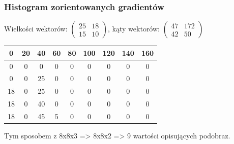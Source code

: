 \documentclass{beamer}
\begin{document}
            \begin{frame}
                \frametitle{Histogram zorientowanych gradientów}
                        Wielkości wektorów: $\begin{pmatrix}
                            25 & 18\\
                            15 & 10
                        \end{pmatrix}$, 
                        kąty wektorów: $\begin{pmatrix}
                            47 & 172\\
                            42 & 50
                        \end{pmatrix}$
                        \newline
                        \newline
                        \begin{center}
                            \begin{tabular}{ |c|c|c|c|c|c|c|c|c| }
                                \hline
                                    0 & 20 & 40 & 60 & 80 & 100 & 120 & 140 & 160\\
                                    \hline
                                    0 & 0 & 0 & 0 & 0 & 0 & 0 & 0 & 0\\
                                    0 & 0 & 25 & 0 & 0 & 0 & 0 & 0 & 0\\
                                    18 & 0 & 25 & 0 & 0 & 0 & 0 & 0 & 0\\
                                    18 & 0 & 40 & 0 & 0 & 0 & 0 & 0 & 0\\
                                    18 & 0 & 45 & 5 & 0 & 0 & 0 & 0 & 0\\
                                \hline
                            \end{tabular}
                        \end{center}
                        Tym sposobem z 8x8x3 => 8x8x2 => 9 wartości opisujących podobraz.
            \end{frame}
\end{document}
